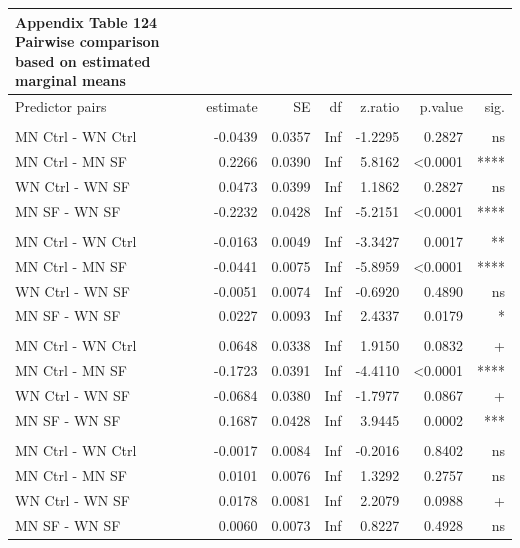 \documentclass[
  12pt,
  letterpaper,
]{article}
\begin{document}
\begingroup
\fontsize{12.0pt}{14.4pt}\selectfont
\begin{longtable}{l|rrrrrr}
\caption*{
{\large \textbf{Appendix Table 124}} \\ 
{\small \textbf{Pairwise comparison based on estimated marginal means}}
} \\ 
\toprule
Predictor pairs & {estimate} & {SE} & {df} & {z.ratio} & {p.value} & {sig.} \\ 
\midrule\addlinespace[2.5pt]
\multicolumn{7}{l}{Lymphocytes} \\[2.5pt] 
\midrule\addlinespace[2.5pt]
MN Ctrl - WN Ctrl & -0.0439 & 0.0357 & Inf & -1.2295 & 0.2827 & ns \\ 
MN Ctrl - MN SF & 0.2266 & 0.0390 & Inf & 5.8162 & <0.0001 & **** \\ 
WN Ctrl - WN SF & 0.0473 & 0.0399 & Inf & 1.1862 & 0.2827 & ns \\ 
MN SF - WN SF & -0.2232 & 0.0428 & Inf & -5.2151 & <0.0001 & **** \\ 
\midrule\addlinespace[2.5pt]
\multicolumn{7}{l}{Monocytes} \\[2.5pt] 
\midrule\addlinespace[2.5pt]
MN Ctrl - WN Ctrl & -0.0163 & 0.0049 & Inf & -3.3427 & 0.0017 & ** \\ 
MN Ctrl - MN SF & -0.0441 & 0.0075 & Inf & -5.8959 & <0.0001 & **** \\ 
WN Ctrl - WN SF & -0.0051 & 0.0074 & Inf & -0.6920 & 0.4890 & ns \\ 
MN SF - WN SF & 0.0227 & 0.0093 & Inf & 2.4337 & 0.0179 & * \\ 
\midrule\addlinespace[2.5pt]
\multicolumn{7}{l}{Neutrophils} \\[2.5pt] 
\midrule\addlinespace[2.5pt]
MN Ctrl - WN Ctrl & 0.0648 & 0.0338 & Inf & 1.9150 & 0.0832 & + \\ 
MN Ctrl - MN SF & -0.1723 & 0.0391 & Inf & -4.4110 & <0.0001 & **** \\ 
WN Ctrl - WN SF & -0.0684 & 0.0380 & Inf & -1.7977 & 0.0867 & + \\ 
MN SF - WN SF & 0.1687 & 0.0428 & Inf & 3.9445 & 0.0002 & *** \\ 
\midrule\addlinespace[2.5pt]
\multicolumn{7}{l}{Other} \\[2.5pt] 
\midrule\addlinespace[2.5pt]
MN Ctrl - WN Ctrl & -0.0017 & 0.0084 & Inf & -0.2016 & 0.8402 & ns \\ 
MN Ctrl - MN SF & 0.0101 & 0.0076 & Inf & 1.3292 & 0.2757 & ns \\ 
WN Ctrl - WN SF & 0.0178 & 0.0081 & Inf & 2.2079 & 0.0988 & + \\ 
MN SF - WN SF & 0.0060 & 0.0073 & Inf & 0.8227 & 0.4928 & ns \\ 
\bottomrule
\end{longtable}
\endgroup
\end{document}
